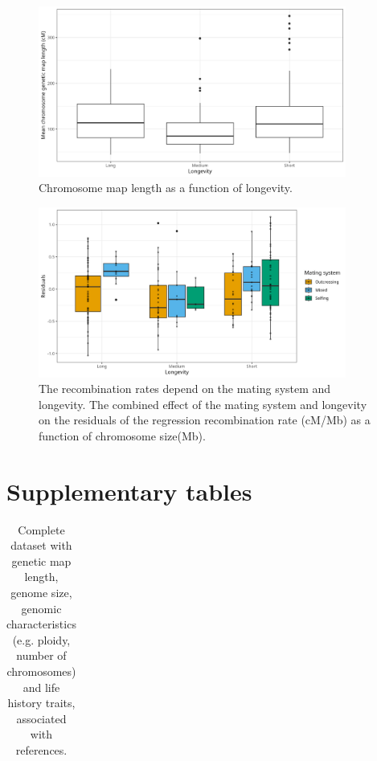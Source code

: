 \documentclass{article}
\begin{document}
\begin{figure}[h!]
  \includegraphics[width=0.9\textwidth]{figures/FigS4.jpeg}
  \centering
  \caption{Chromosome map length as a function of longevity.
  }
  \label{figure:FigS4}
\end{figure}


\begin{figure}[h!]
  \includegraphics[width=0.9\textwidth]{figures/FigS5.jpeg}
  \centering
  \caption{The recombination rates depend on the mating system and longevity. The combined effect of the mating system and longevity on the residuals of the regression recombination rate (cM/Mb) as a function of chromosome size(Mb).
  }
  \label{figure:FigS5}
\end{figure}




\clearpage

\section*{Supplementary tables}

\renewcommand{\thetable}{S\arabic{table}}

\setcounter{table}{0}


\begin{table}[h!]
\centering{}
\caption{Complete dataset with genetic map length, genome size, genomic characteristics (e.g. ploidy, number of chromosomes) and life history traits, associated with references.}
\begin{tabular}{cccccccc}
\end{tabular}
\label{table:tableS1}
\end{table}
\end{document}
